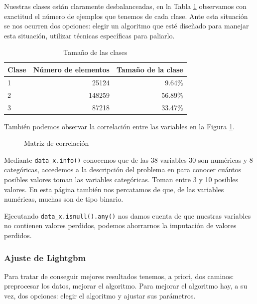 \documentclass[a4paper, 20pt]{article}
\begin{document}
Nuestras clases están claramente desbalanceadas, en la Tabla \ref{tab:tam_clas} observamos con exactitud el número de ejemplos que tenemos de cada clase. Ante esta situación se nos ocurren dos opciones: elegir un algoritmo que esté diseñado para manejar esta situación, utilizar técnicas específicas para paliarlo.

\begin{table}[H]
\centering
\caption{Tamaño de las clases}
\label{tab:tam_clas}
\begin{tabular}{lrr}
\toprule
Clase & Número de elementos & Tamaño de la clase\\
\midrule
1 & 25124 & 9.64\%\\
2 & 148259 & 56.89\%\\
3 & 87218 & 33.47\%\\
\bottomrule
\end{tabular}
\end{table}

También podemos observar la correlación entre las variables en la Figura \ref{fig:corr_matrix}.


\begin{figure}[H]
  \centering
  
  \caption{Matriz de correlación}
  \label{fig:corr_matrix}
\end{figure}


Mediante \texttt{data\_x.info()} conocemos que de las 38 variables 30 son numéricas y 8 categóricas, accedemos a la descripción del problema en %
para conocer cuántos posibles valores toman las variables categóricas. Toman entre 3 y 10 posibles valores. En esta página también nos percatamos de que, de las variables numéricas, muchas son de tipo binario.

Ejecutando \texttt{data\_x.isnull().any()} nos damos cuenta de que nuestras variables no contienen valores perdidos, podemos ahorrarnos la imputación de valores perdidos.


\subsubsection{Ajuste de Lightgbm}

Para tratar de conseguir mejores resultados tenemos, a priori, dos caminos: preprocesar los datos, mejorar el algoritmo. Para mejorar el algoritmo hay, a su vez, dos opciones: elegir el algoritmo y ajustar sus parámetros.
\end{document}

